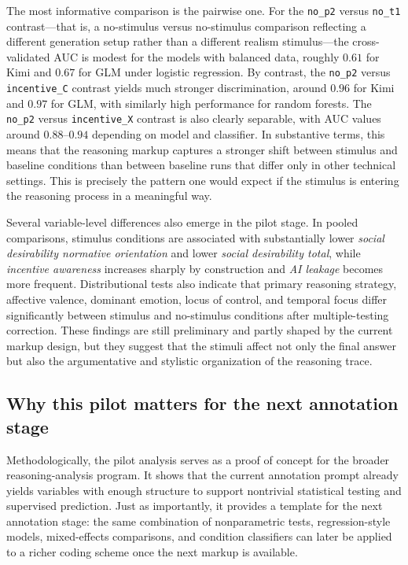 \documentclass[14pt,a4paper]{extarticle}
\begin{document}
The most informative comparison is the pairwise one. For the \texttt{no\_p2} versus \texttt{no\_t1} contrast---that is, a no-stimulus versus no-stimulus comparison reflecting a different generation setup rather than a different realism stimulus---the cross-validated AUC is modest for the models with balanced data, roughly $0.61$ for Kimi and $0.67$ for GLM under logistic regression. By contrast, the \texttt{no\_p2} versus \texttt{incentive\_C} contrast yields much stronger discrimination, around $0.96$ for Kimi and $0.97$ for GLM, with similarly high performance for random forests. The \texttt{no\_p2} versus \texttt{incentive\_X} contrast is also clearly separable, with AUC values around $0.88$--$0.94$ depending on model and classifier. In substantive terms, this means that the reasoning markup captures a stronger shift between stimulus and baseline conditions than between baseline runs that differ only in other technical settings. This is precisely the pattern one would expect if the stimulus is entering the reasoning process in a meaningful way.

Several variable-level differences also emerge in the pilot stage. In pooled comparisons, stimulus conditions are associated with substantially lower \textit{social desirability normative orientation} and lower \textit{social desirability total}, while \textit{incentive awareness} increases sharply by construction and \textit{AI leakage} becomes more frequent. Distributional tests also indicate that primary reasoning strategy, affective valence, dominant emotion, locus of control, and temporal focus differ significantly between stimulus and no-stimulus conditions after multiple-testing correction. These findings are still preliminary and partly shaped by the current markup design, but they suggest that the stimuli affect not only the final answer but also the argumentative and stylistic organization of the reasoning trace.

\subsection{Why this pilot matters for the next annotation stage}

Methodologically, the pilot analysis serves as a proof of concept for the broader reasoning-analysis program. It shows that the current annotation prompt already yields variables with enough structure to support nontrivial statistical testing and supervised prediction. Just as importantly, it provides a template for the next annotation stage: the same combination of nonparametric tests, regression-style models, mixed-effects comparisons, and condition classifiers can later be applied to a richer coding scheme once the next markup is available.
\end{document}
